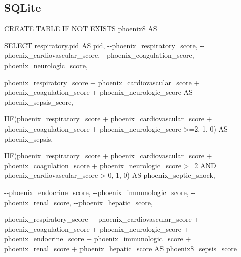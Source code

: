\documentclass[
  letterpaper,
  DIV=11,
  numbers=noendperiod]{scrartcl}
\newenvironment{Shaded}{\begin{snugshade}}{\end{snugshade}}
\newcommand{\CommentTok}[1]{\textcolor[rgb]{0.37,0.37,0.37}{#1}}
\newcommand{\ControlFlowTok}[1]{\textcolor[rgb]{0.00,0.23,0.31}{#1}}
\newcommand{\DecValTok}[1]{\textcolor[rgb]{0.68,0.00,0.00}{#1}}
\newcommand{\KeywordTok}[1]{\textcolor[rgb]{0.00,0.23,0.31}{#1}}
\newcommand{\NormalTok}[1]{\textcolor[rgb]{0.00,0.23,0.31}{#1}}
\newcommand{\OperatorTok}[1]{\textcolor[rgb]{0.37,0.37,0.37}{#1}}
\begin{document}
\subsection{SQLite}\label{sqlite-9}

\begin{Shaded}
\begin{Highlighting}[]
\KeywordTok{CREATE} \KeywordTok{TABLE} \ControlFlowTok{IF} \KeywordTok{NOT} \KeywordTok{EXISTS}\NormalTok{ phoenix8 }\KeywordTok{AS}

\KeywordTok{SELECT}
\NormalTok{  respiratory.pid }\KeywordTok{AS}\NormalTok{ pid,}
  \CommentTok{{-}{-}phoenix\_respiratory\_score,}
  \CommentTok{{-}{-}phoenix\_cardiovascular\_score,}
  \CommentTok{{-}{-}phoenix\_coagulation\_score,}
  \CommentTok{{-}{-}phoenix\_neurologic\_score,}

\NormalTok{  phoenix\_respiratory\_score }\OperatorTok{+}\NormalTok{ phoenix\_cardiovascular\_score }\OperatorTok{+}
\NormalTok{    phoenix\_coagulation\_score }\OperatorTok{+}\NormalTok{ phoenix\_neurologic\_score }\KeywordTok{AS}\NormalTok{ phoenix\_sepsis\_score,}

\NormalTok{  IIF(phoenix\_respiratory\_score }\OperatorTok{+}\NormalTok{ phoenix\_cardiovascular\_score }\OperatorTok{+}
\NormalTok{    phoenix\_coagulation\_score }\OperatorTok{+}\NormalTok{ phoenix\_neurologic\_score }\OperatorTok{\textgreater{}=}\DecValTok{2}\NormalTok{, }\DecValTok{1}\NormalTok{, }\DecValTok{0}\NormalTok{) }\KeywordTok{AS}\NormalTok{ phoenix\_sepsis,}

\NormalTok{  IIF(phoenix\_respiratory\_score }\OperatorTok{+}\NormalTok{ phoenix\_cardiovascular\_score }\OperatorTok{+}
\NormalTok{    phoenix\_coagulation\_score }\OperatorTok{+}\NormalTok{ phoenix\_neurologic\_score }\OperatorTok{\textgreater{}=}\DecValTok{2} \KeywordTok{AND}
\NormalTok{    phoenix\_cardiovascular\_score }\OperatorTok{\textgreater{}} \DecValTok{0}\NormalTok{, }\DecValTok{1}\NormalTok{, }\DecValTok{0}\NormalTok{) }\KeywordTok{AS}\NormalTok{ phoenix\_septic\_shock,}

  \CommentTok{{-}{-}phoenix\_endocrine\_score,}
  \CommentTok{{-}{-}phoenix\_immunologic\_score,}
  \CommentTok{{-}{-}phoenix\_renal\_score,}
  \CommentTok{{-}{-}phoenix\_hepatic\_score,}

\NormalTok{  phoenix\_respiratory\_score }\OperatorTok{+}\NormalTok{ phoenix\_cardiovascular\_score }\OperatorTok{+}
\NormalTok{    phoenix\_coagulation\_score }\OperatorTok{+}\NormalTok{ phoenix\_neurologic\_score  }\OperatorTok{+}
\NormalTok{    phoenix\_endocrine\_score }\OperatorTok{+}\NormalTok{ phoenix\_immunologic\_score }\OperatorTok{+}
\NormalTok{    phoenix\_renal\_score }\OperatorTok{+}\NormalTok{ phoenix\_hepatic\_score }\KeywordTok{AS}\NormalTok{ phoenix8\_sepsis\_score}


\end{Highlighting}
\end{Shaded}
\end{document}
